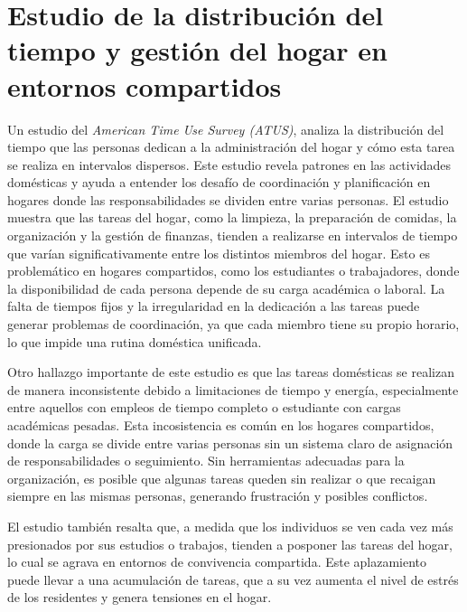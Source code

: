 \documentclass{article}
\title{}
\author{}
\date{}
\begin{document}
\maketitle

\section{Estudio de la distribución del tiempo y gestión del hogar en entornos compartidos}

Un estudio del \textit{American Time Use Survey (ATUS)}, analiza la distribución del tiempo que las personas dedican a la administración del hogar
y cómo esta tarea se realiza en intervalos dispersos. Este estudio revela patrones en las actividades domésticas y ayuda a entender los 
desafío de coordinación y planificación en hogares donde las responsabilidades se dividen entre varias personas. El estudio muestra
que las tareas del hogar, como la limpieza, la preparación de comidas, la organización y la gestión de finanzas, tienden a realizarse en 
intervalos de tiempo que varían significativamente entre los distintos miembros del hogar. Esto es problemático en hogares compartidos, como 
los estudiantes o trabajadores, donde la disponibilidad de cada persona depende de su carga académica o laboral. La falta de tiempos fijos y 
la irregularidad en la dedicación a las tareas puede generar problemas de coordinación, ya que cada miembro tiene su propio horario, lo que impide
una rutina doméstica unificada.

Otro hallazgo importante de este estudio es que las tareas domésticas se realizan de manera inconsistente debido a limitaciones de tiempo y energía, especialmente
entre aquellos con empleos de tiempo completo o estudiante con cargas académicas pesadas. Esta incosistencia es común en los hogares compartidos,
donde la carga se divide entre varias personas sin un sistema claro de asignación de responsabilidades o seguimiento. Sin herramientas adecuadas
para la organización, es posible que algunas tareas queden sin realizar o que recaigan siempre en las mismas personas, generando frustración y posibles 
conflictos.

El estudio también resalta que, a medida que los individuos se ven cada vez más presionados por sus estudios o trabajos, tienden a posponer las tareas del hogar, lo cual se 
agrava en entornos de convivencia compartida. Este aplazamiento puede llevar a una acumulación de tareas, que a su vez aumenta el nivel de estrés de los residentes y genera tensiones en el hogar.
\end{document}
